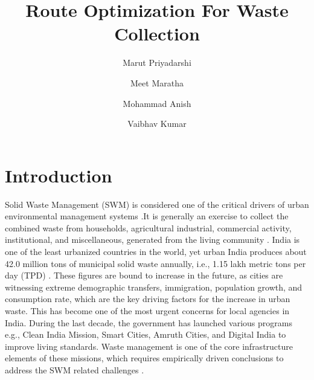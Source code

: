 \documentclass[12pt]{article}
\begin{document}

\title{Route Optimization For Waste Collection\\}

\author[1]{Marut Priyadarshi}
\author[1]{Meet Maratha}
\author[2]{Mohammad Anish}
\author[1]{Vaibhav Kumar}

\maketitle

\section{Introduction}

Solid Waste Management (SWM) is considered one of the critical drivers of urban environmental management systems \cite{hoornweg2012waste}.It is generally an exercise to collect the combined waste from households, agricultural industrial, commercial activity, institutional, and miscellaneous, generated from the living community \cite{GUPTA2015206}. India is one of the least urbanized countries in the world, yet urban India produces about 42.0 million tons of municipal solid waste annually, i.e., 1.15 lakh metric tons per day (TPD) \cite{SHARMA2021293,GUPTA2015206}. These figures are bound to increase in the future, as cities are witnessing extreme demographic transfers, immigration, population growth, and consumption rate, which are the key driving factors for the increase in urban waste. This has become one of the most urgent concerns for local agencies in India. During the last decade, the government has launched various programs e.g., Clean India Mission, Smart Cities, Amruth Cities, and Digital India to improve living standards. Waste management is one of the core infrastructure elements of these missions, which requires empirically driven conclusions to address the SWM related challenges \cite{CHEELA2021419}. 
\end{document}
